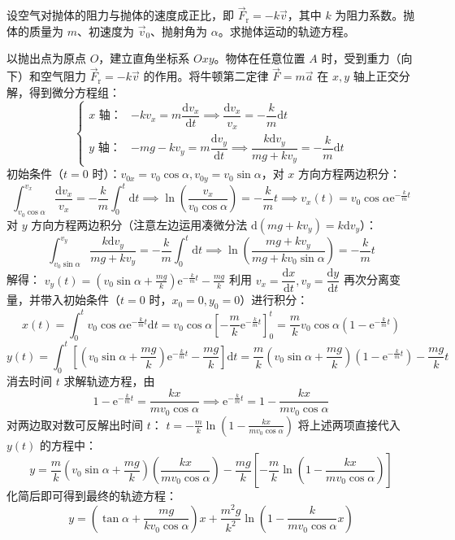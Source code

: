 \documentclass[lang=cn,11pt]{elegantbook}
\begin{document}
\begin{exercise}
设空气对抛体的阻力与抛体的速度成正比，即 $\vec{F}_{\text{r}} = -k\vec{v}$，其中 $k$ 为阻力系数。抛体的质量为 $m$、初速度为 $\vec{v}_0$、抛射角为 $\alpha$。求抛体运动的轨迹方程。
\end{exercise}
\begin{solution}
以抛出点为原点 $O$，建立直角坐标系 $Oxy$。物体在任意位置 $A$ 时，受到重力（向下）和空气阻力 $\vec{F}_{\text{r}} = -k\vec{v}$ 的作用。将牛顿第二定律 $\vec{F} = m\vec{a}$ 在 $x, y$ 轴上正交分解，得到微分方程组：
\[\begin{cases}
\text{$x$ 轴：} & -kv_x = m \dfrac{\mathrm{d}v_x}{\mathrm{d}t} \implies\dfrac{\mathrm{d}v_x}{v_x} = -\dfrac{k}{m}\mathrm{d}t\\
\text{$y$ 轴：} & -mg - kv_y = m \dfrac{\mathrm{d}v_y}{\mathrm{d}t}\implies \dfrac{k\mathrm{d}v_y}{mg + kv_y} = -\dfrac{k}{m}\mathrm{d}t
\end{cases}\]
初始条件（$t=0$ 时）：$v_{0x} = v_0\cos\alpha,v_{0y} = v_0\sin\alpha$，对 $x$ 方向方程两边积分：
\[\int_{v_0\cos\alpha}^{v_x} \frac{\mathrm{d}v_x}{v_x} = -\frac{k}{m}\int_{0}^{t}\mathrm{d}t \implies \ln\left(\frac{v_x}{v_0\cos\alpha}\right) = -\frac{k}{m}t\implies v_x(t) = v_0\cos\alpha \mathrm{e}^{-\frac{k}{m}t}\]
对 $y$ 方向方程两边积分（注意左边运用凑微分法 $\mathrm{d}(mg+kv_y) = k\mathrm{d}v_y$）：
$$\int_{v_0\sin\alpha}^{v_y} \frac{k\mathrm{d}v_y}{mg + kv_y} = -\frac{k}{m}\int_{0}^{t}\mathrm{d}t \implies \ln\left(\frac{mg + kv_y}{mg + kv_0\sin\alpha}\right) = -\frac{k}{m}t$$解得： \(v_y(t) = \left(v_0\sin\alpha + \frac{mg}{k}\right)\mathrm{e}^{-\frac{k}{m}t} - \frac{mg}{k}\) 
利用 $v_x = \dfrac{\mathrm{d}x}{\mathrm{d}t}, v_y = \dfrac{\mathrm{d}y}{\mathrm{d}t}$ 再次分离变量，并带入初始条件（$t=0$ 时，$x_0=0, y_0=0$）进行积分：
$$x(t) = \int_{0}^{t} v_0\cos\alpha \mathrm{e}^{-\frac{k}{m}t} \mathrm{d}t = v_0\cos\alpha \left[ -\frac{m}{k}\mathrm{e}^{-\frac{k}{m}t} \right]_0^t = \frac{m}{k}v_0\cos\alpha\left(1 - \mathrm{e}^{-\frac{k}{m}t}\right)$$
$$y(t) = \int_{0}^{t} \left[\left(v_0\sin\alpha + \frac{mg}{k}\right)\mathrm{e}^{-\frac{k}{m}t} - \frac{mg}{k}\right] \mathrm{d}t = \frac{m}{k}\left(v_0\sin\alpha + \frac{mg}{k}\right)\left(1 - \mathrm{e}^{-\frac{k}{m}t}\right) - \frac{mg}{k}t$$
消去时间 $t$ 求解轨迹方程，由
$$1 - \mathrm{e}^{-\frac{k}{m}t} = \frac{kx}{mv_0\cos\alpha} \implies \mathrm{e}^{-\frac{k}{m}t} = 1 - \frac{kx}{mv_0\cos\alpha}$$对两边取对数可反解出时间 $t$： \(t = -\frac{m}{k}\ln\left(1 - \frac{kx}{mv_0\cos\alpha}\right)\) 将上述两项直接代入 $y(t)$ 的方程中：$$y = \frac{m}{k}\left(v_0\sin\alpha + \frac{mg}{k}\right)\left(\frac{kx}{mv_0\cos\alpha}\right) - \frac{mg}{k}\left[-\frac{m}{k}\ln\left(1 - \frac{kx}{mv_0\cos\alpha}\right)\right]$$化简后即可得到最终的轨迹方程：$$y = \left(\tan\alpha + \frac{mg}{kv_0\cos\alpha}\right)x + \frac{m^2g}{k^2}\ln\left(1 - \frac{k}{mv_0\cos\alpha}x\right)$$
\end{solution}
\end{document}
